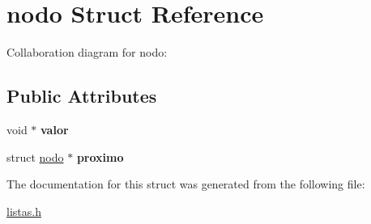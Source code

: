 \hypertarget{structnodo}{}\section{nodo Struct Reference}
\label{structnodo}


Collaboration diagram for nodo\+:
\subsection*{Public Attributes}
\begin{DoxyCompactItemize}
\item 
\mbox{\label{structnodo_ab63adcdb83ea1fdcf4fa10f3cafc4a6a}} 
void $\ast$ {\bfseries valor}
\item 
\mbox{\label{structnodo_aaaabdcb6641ddcdac8990402242b154a}} 
struct \hyperlink{structnodo}{nodo} $\ast$ {\bfseries proximo}
\end{DoxyCompactItemize}


The documentation for this struct was generated from the following file\+:\begin{DoxyCompactItemize}
\item 
\hyperlink{listas_8h}{listas.\+h}\end{DoxyCompactItemize}
